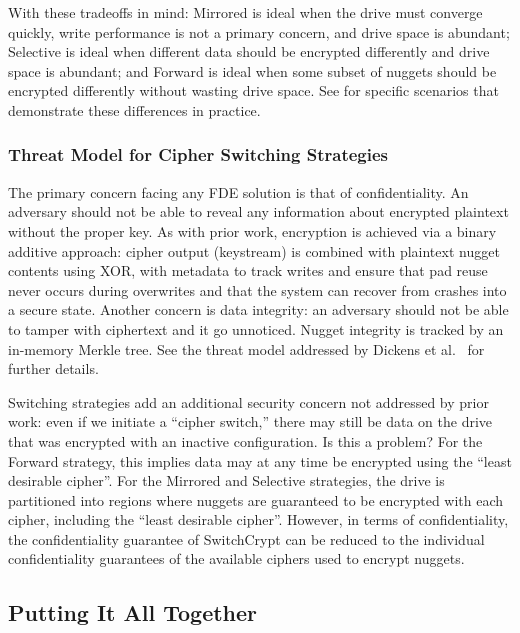 With these tradeoffs in mind: Mirrored is ideal when the drive must converge
quickly, write performance is not a primary concern, and drive space is
abundant; Selective is ideal when different data should be encrypted differently
and drive space is abundant; and Forward is ideal when some subset of nuggets
should be encrypted differently without wasting drive space. See
 for specific scenarios that demonstrate these differences in
practice.

\subsubsection{Threat Model for Cipher Switching Strategies}

The primary concern facing any FDE solution is that of confidentiality. An
adversary should not be able to reveal any information about encrypted plaintext
without the proper key. As with prior work, encryption is achieved via a binary
additive approach: cipher output (keystream) is combined with plaintext nugget
contents using XOR, with metadata to track writes and ensure that pad reuse
never occurs during overwrites and that the system can recover from crashes into
a secure state. Another concern is data integrity: an adversary should not be
able to tamper with ciphertext and it go unnoticed. Nugget integrity is tracked
by an in-memory Merkle tree. See the threat model addressed by Dickens et
al.~\cite{StrongBox} for further details.

Switching strategies add an additional security concern not addressed by prior
work: even if we initiate a ``cipher switch,'' there may still be data on the
drive that was encrypted with an inactive configuration. Is this a problem? For
the Forward strategy, this implies data may at any time be encrypted using the
``least desirable cipher''. For the Mirrored and Selective strategies, the drive
is partitioned into regions where nuggets are guaranteed to be encrypted with
each cipher, including the ``least desirable cipher''. However, in terms of
confidentiality, the confidentiality guarantee of SwitchCrypt can be reduced to
the individual confidentiality guarantees of the available ciphers used to
encrypt nuggets.

\subsection{Putting It All Together} \label{subsec:summary}

